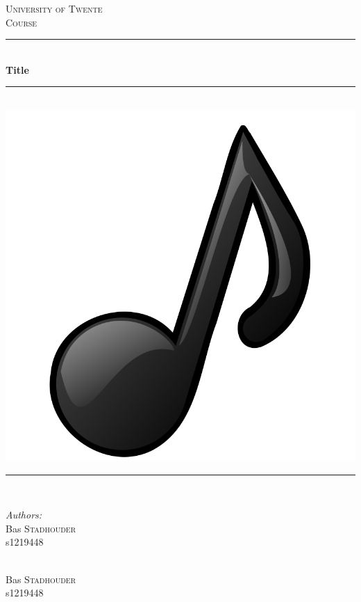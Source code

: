 \documentclass[a4paper,12pt,titlepage]{article}
\newcommand{\HRule}{\rule{\linewidth}{0.5mm}}
\begin{document}
\begin{titlepage}
\begin{center}


\textsc{\LARGE University of Twente}\\[1.5cm]

\textsc{\Large Course}\\[0.5cm]

\HRule \\[0.4cm]
{ \huge \bfseries Title}\\[0.4cm]

\HRule \\[1cm]
\includegraphics[scale=0.3]{figures/muzieknoot}
\HRule \\[2cm]

\begin{minipage}{0.4\textwidth}
\begin{flushleft} \large
\emph{Authors:}\\
Bas \textsc{Stadhouder}\\s1219448
\end{flushleft}
\end{minipage}
\begin{minipage}{0.4\textwidth}
\begin{flushright} \large
\emph{} \\
Bas \textsc{Stadhouder}\\s1219448
\end{flushright}
\end{minipage}


\end{center}
\end{titlepage}
\end{document}
